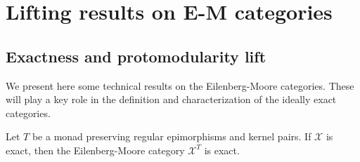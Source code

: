 \chapter{Lifting results on E-M categories}

\fontsize{12}{14.5}\selectfont

\section{Exactness and protomodularity lift}

We present here some technical results on the Eilenberg-Moore categories. These will play a key role in the definition and characterization of the ideally exact categories.

\begin{mainbox}{}
    \begin{prop}\label{algebras category is exact if the base category is exact}
        Let $T$ be a monad preserving regular epimorphisms and kernel pairs. If $\mathcal{X}$ is exact, then the Eilenberg-Moore category $\mathcal{X}^T$ is exact.
    \end{prop}
\end{mainbox}

